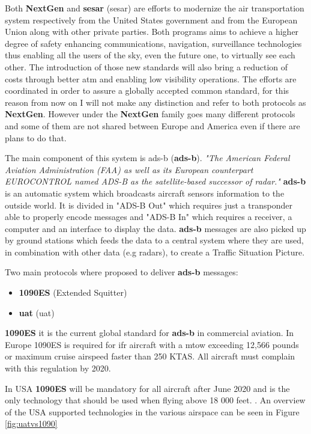 \documentclass[../main.tex]{subfiles}
\begin{document}
Both \textbf{NextGen} and \textbf{\acrshort{sesar}} (\acrlong{sesar}) are efforts to modernize the air transportation system respectively from the United States government and from the European Union along with other private parties. Both programs aims to achieve a higher degree of safety enhancing communications, navigation, surveillance technologies thus enabling all the users of the sky, even the future one, to virtually see each other. The introduction of those new standards will also bring a reduction of costs through better \acrshort{atm} and enabling low visibility operations. The efforts are coordinated in order to assure a globally accepted common standard, for this reason from now on I will not make any distinction and refer to both protocols as \textbf{NextGen}. However under the \textbf{NextGen} family goes many different protocols and some of them are not shared between Europe and America even if there are plans to do that.

The main component of this system is \acrlong{ads-b} (\textbf{\acrshort{ads-b}}).
\textit{"The American Federal Aviation Administration (FAA) as well as its European counterpart EUROCONTROL named ADS-B as the satellite-based successor of radar."}\cite{stroh14}
\textbf{\acrshort{ads-b}} is an automatic system which broadcasts aircraft sensors information to the outside world. It is divided in "ADS-B Out" which requires just a transponder able to properly encode messages and "ADS-B In" which requires a receiver, a computer and an interface to display the data.
\textbf{\acrshort{ads-b}} messages are also picked up by ground stations which feeds the data to a central system where they are used, in combination with other data (e.g radars), to create a Traffic Situation Picture.

Two main protocols where proposed to deliver \textbf{\acrshort{ads-b}} messages:
\begin{itemize}
  \item \textbf{1090ES} (Extended Squitter)
  \item \textbf{\acrshort{uat}} (\acrlong{uat})
\end{itemize}

\textbf{1090ES} it is the current global standard for \textbf{\acrshort{ads-b}} in commercial aviation. In Europe 1090ES is required for \acrshort{ifr} aircraft with a \acrshort{mtow} exceeding 12,566 pounds or maximum cruise airspeed faster than 250 KTAS. All aircraft must complain with this regulation by 2020. \cite{eu1090}

In USA \textbf{1090ES} will be mandatory for all aircraft after June 2020 and is the only technology that should be used when flying above 18 000 feet.
\cite{title14}. An overview of the USA supported technologies in the various airspace can be seen in Figure \ref{fig:uatvs1090}
\end{document}
